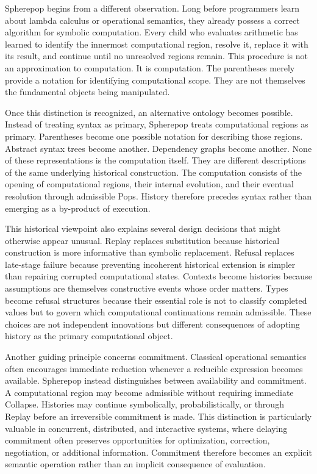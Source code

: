 \documentclass[12pt,oneside]{article}
\theoremstyle{definition}
\theoremstyle{remark}
\begin{document}
Spherepop begins from a different observation. Long before programmers learn
about lambda calculus or operational semantics, they already possess a correct
algorithm for symbolic computation. Every child who evaluates arithmetic has
learned to identify the innermost computational region, resolve it, replace it
with its result, and continue until no unresolved regions remain. This
procedure is not an approximation to computation. It is computation. The
parentheses merely provide a notation for identifying computational scope.
They are not themselves the fundamental objects being manipulated.

Once this distinction is recognized, an alternative ontology becomes possible.
Instead of treating syntax as primary, Spherepop treats computational regions
as primary. Parentheses become one possible notation for describing those
regions. Abstract syntax trees become another. Dependency graphs become
another. None of these representations is the computation itself. They are
different descriptions of the same underlying historical construction. The
computation consists of the opening of computational regions, their internal
evolution, and their eventual resolution through admissible Pops. History
therefore precedes syntax rather than emerging as a by-product of execution.

This historical viewpoint also explains several design decisions that might
otherwise appear unusual. Replay replaces substitution because historical
construction is more informative than symbolic replacement. Refusal replaces
late-stage failure because preventing incoherent historical extension is
simpler than repairing corrupted computational states. Contexts become
histories because assumptions are themselves constructive events whose order
matters. Types become refusal structures because their essential role is not
to classify completed values but to govern which computational continuations
remain admissible. These choices are not independent innovations but different
consequences of adopting history as the primary computational object.

Another guiding principle concerns commitment. Classical operational semantics
often encourages immediate reduction whenever a reducible expression becomes
available. Spherepop instead distinguishes between availability and
commitment. A computational region may become admissible without requiring
immediate Collapse. Histories may continue symbolically, probabilistically, or
through Replay before an irreversible commitment is made. This distinction is
particularly valuable in concurrent, distributed, and interactive systems,
where delaying commitment often preserves opportunities for optimization,
correction, negotiation, or additional information. Commitment therefore
becomes an explicit semantic operation rather than an implicit consequence of
evaluation.
\end{document}
